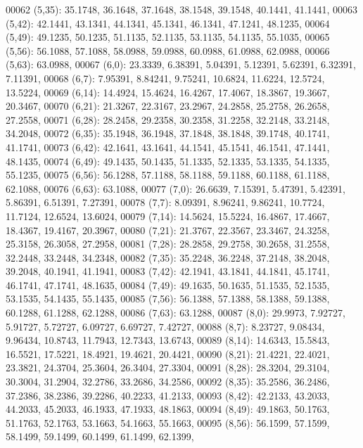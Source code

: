 \begin{DoxyCode}
00062       (5,35): 35.1748, 36.1648, 37.1648, 38.1548, 39.1548, 40.1441, 41.1441,
00063       (5,42): 42.1441, 43.1341, 44.1341, 45.1341, 46.1341, 47.1241, 48.1235,
00064       (5,49): 49.1235, 50.1235, 51.1135, 52.1135, 53.1135, 54.1135, 55.1035,
00065       (5,56): 56.1088, 57.1088, 58.0988, 59.0988, 60.0988, 61.0988, 62.0988,
00066       (5,63): 63.0988,
00067       (6,0): 23.3339, 6.38391, 5.04391, 5.12391, 5.62391, 6.32391, 7.11391,
00068       (6,7): 7.95391, 8.84241, 9.75241, 10.6824, 11.6224, 12.5724, 13.5224,
00069       (6,14): 14.4924, 15.4624, 16.4267, 17.4067, 18.3867, 19.3667, 20.3467,
00070       (6,21): 21.3267, 22.3167, 23.2967, 24.2858, 25.2758, 26.2658, 27.2558,
00071       (6,28): 28.2458, 29.2358, 30.2358, 31.2258, 32.2148, 33.2148, 34.2048,
00072       (6,35): 35.1948, 36.1948, 37.1848, 38.1848, 39.1748, 40.1741, 41.1741,
00073       (6,42): 42.1641, 43.1641, 44.1541, 45.1541, 46.1541, 47.1441, 48.1435,
00074       (6,49): 49.1435, 50.1435, 51.1335, 52.1335, 53.1335, 54.1335, 55.1235,
00075       (6,56): 56.1288, 57.1188, 58.1188, 59.1188, 60.1188, 61.1188, 62.1088,
00076       (6,63): 63.1088,
00077       (7,0): 26.6639, 7.15391, 5.47391, 5.42391, 5.86391, 6.51391, 7.27391,
00078       (7,7): 8.09391, 8.96241, 9.86241, 10.7724, 11.7124, 12.6524, 13.6024,
00079       (7,14): 14.5624, 15.5224, 16.4867, 17.4667, 18.4367, 19.4167, 20.3967,
00080       (7,21): 21.3767, 22.3567, 23.3467, 24.3258, 25.3158, 26.3058, 27.2958,
00081       (7,28): 28.2858, 29.2758, 30.2658, 31.2558, 32.2448, 33.2448, 34.2348,
00082       (7,35): 35.2248, 36.2248, 37.2148, 38.2048, 39.2048, 40.1941, 41.1941,
00083       (7,42): 42.1941, 43.1841, 44.1841, 45.1741, 46.1741, 47.1741, 48.1635,
00084       (7,49): 49.1635, 50.1635, 51.1535, 52.1535, 53.1535, 54.1435, 55.1435,
00085       (7,56): 56.1388, 57.1388, 58.1388, 59.1388, 60.1288, 61.1288, 62.1288,
00086       (7,63): 63.1288,
00087       (8,0): 29.9973, 7.92727, 5.91727, 5.72727, 6.09727, 6.69727, 7.42727,
00088       (8,7): 8.23727, 9.08434, 9.96434, 10.8743, 11.7943, 12.7343, 13.6743,
00089       (8,14): 14.6343, 15.5843, 16.5521, 17.5221, 18.4921, 19.4621, 20.4421,
00090       (8,21): 21.4221, 22.4021, 23.3821, 24.3704, 25.3604, 26.3404, 27.3304,
00091       (8,28): 28.3204, 29.3104, 30.3004, 31.2904, 32.2786, 33.2686, 34.2586,
00092       (8,35): 35.2586, 36.2486, 37.2386, 38.2386, 39.2286, 40.2233, 41.2133,
00093       (8,42): 42.2133, 43.2033, 44.2033, 45.2033, 46.1933, 47.1933, 48.1863,
00094       (8,49): 49.1863, 50.1763, 51.1763, 52.1763, 53.1663, 54.1663, 55.1663,
00095       (8,56): 56.1599, 57.1599, 58.1499, 59.1499, 60.1499, 61.1499, 62.1399,

\end{DoxyCode}
